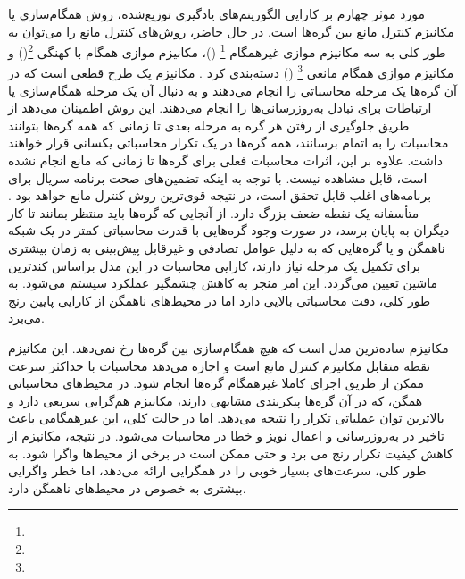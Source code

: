 مورد موثر چهارم بر کارایی الگوریتم‌های یادگیری توزیع‌شده، روش همگام‌سازي یا مکانیزم کنترل مانع بین گره‌ها است.  در حال حاضر، روش‌های کنترل مانع را می‌توان به طور کلی به سه مکانیزم موازی غیرهمگام \footnote{} ()، مکانیزم موازی همگام با کهنگی \footnote{}() و مکانیزم موازی همگام مانعی \footnote{} () دسته‌بندی کرد \cite{NIPS2012}. مکانیزم  یک طرح قطعی است که در آن گره‌ها یک مرحله محاسباتی را انجام می‌دهند و به دنبال آن یک مرحله همگام‌سازی یا ارتباطات برای تبادل به‌روزرسانی‌ها را انجام می‌دهند. این روش اطمینان می‌دهد از طریق جلوگیری از رفتن هر گره به مرحله بعدی تا زمانی که همه گره‌ها بتوانند محاسبات را به اتمام برسانند، همه گره‌ها در یک تکرار محاسباتی یکسانی قرار خواهند داشت. علاوه بر این، اثرات محاسبات فعلی برای گره‌ها تا زمانی که مانع انجام نشده است، قابل مشاهده نیست. با توجه به اینکه تضمین‌های صحت برنامه سریال برای برنامه‌های  اغلب قابل تحقق است، در نتیجه  قوی‌ترین روش کنترل مانع خواهد بود \cite{Ho2013}. متأسفانه  یک نقطه ضعف بزرگ دارد. از آنجایی که گره‌ها باید منتظر بمانند تا کار دیگران به پایان برسد، در صورت وجود گره‌هایی با قدرت محاسباتی کمتر در یک شبکه ناهمگن \cite{NIPS2012} و یا گره‌هایی که به دلیل عوامل تصادفی و غیرقابل پیش‌بینی به زمان بیشتری برای تکمیل یک مرحله نیاز دارند، کارایی محاسبات در این مدل براساس کندترین ماشین تعیین می‌گردد. این امر منجر به کاهش چشمگیر عملکرد سیستم می‌شود. به طور کلی،  دقت محاسباتی بالایی دارد اما در محیط‌های ناهمگن از کارایی پایین رنج می‌برد.

مکانیزم  ساده‌ترین مدل است که هیچ همگام‌سازی بین گره‌ها رخ نمی‌دهد. این مکانیزم نقطه متقابل مکانیزم کنترل مانع  است و اجازه می‌دهد محاسبات با حداکثر سرعت ممکن از طریق اجرای کاملا غیرهمگام گره‌ها انجام شود. در محیط‌های محاسباتی همگن، که در آن گره‌ها پیکربندی‌ مشابهی دارند، مکانیزم  هم‌گرایی سریعی دارد و بالاترین توان عملیاتی تکرار را نتیجه می‌دهد. اما در حالت کلی، این غیرهمگامی باعث تاخیر در به‌روزرسانی و اعمال نویز و خطا در محاسبات می‌شود. در نتیجه، مکانیزم  از کاهش کیفیت تکرار رنج می برد و حتی ممکن است در برخی از محیط‌ها واگرا شود. به طور کلی،  سرعت‌های بسیار خوبی را در همگرایی ارائه می‌دهد، اما خطر واگرایی بیشتری به خصوص در محیط‌های ناهمگن دارد.

